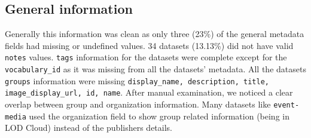 \documentclass[runningheads,a4paper]{llncs}
\begin{document}
\subsection{General information} Generally this information was clean as only three (23\%) of the general metadata fields had missing or undefined values. 34 datasets (13.13\%) did not have valid \texttt{notes} values. \texttt{tags} information for the datasets were complete except for the \texttt{vocabulary\_id} as it was missing from all the datasets' metadata. All the datasets \texttt{groups} information were missing \texttt{display\_name, description, title, image\_display\_url, id, name}. After manual examination, we noticed a clear overlap between group and organization information. Many datasets like \texttt{event-media} used the organization field to show group related information (being in LOD Cloud) instead of the publishers details.\\
\end{document}
